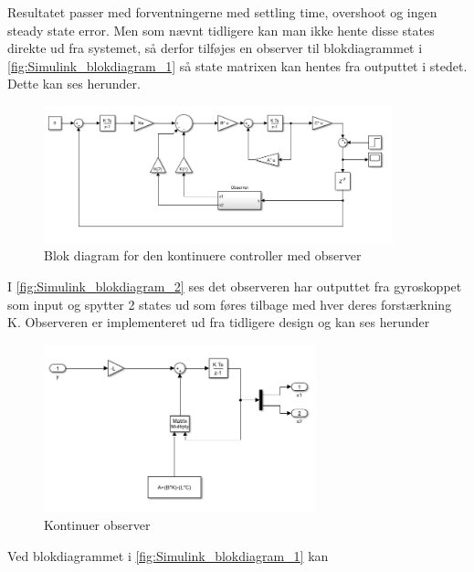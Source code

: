 Resultatet passer med forventningerne med settling time, overshoot og ingen steady state error. Men som nævnt tidligere kan man ikke hente disse states direkte ud fra systemet, så derfor tilføjes en observer til blokdiagrammet i \autoref{fig:Simulink_blokdiagram_1} så state matrixen kan hentes fra outputtet i stedet. Dette kan ses herunder.

\begin{figure}[H]
	\centering
	\includegraphics[width = 0.9\textwidth]{figur/Simulink_blokdiagram_2}
	\caption{Blok diagram for den kontinuere controller med observer}
	\label{fig:Simulink_blokdiagram_2}
\end{figure}
I \autoref{fig:Simulink_blokdiagram_2} ses det observeren har outputtet fra gyroskoppet som input og spytter 2 states ud som føres tilbage med hver deres forstærkning K. Observeren er implementeret ud fra tidligere design og kan ses herunder

\begin{figure}[H]
	\centering
	\includegraphics[width = 0.7\textwidth]{figur/Simulink_observer_continues}
	\caption{Kontinuer observer}
	\label{fig:Simulink_observer_continues}
\end{figure}

Ved blokdiagrammet i \autoref{fig:Simulink_blokdiagram_1} kan 


